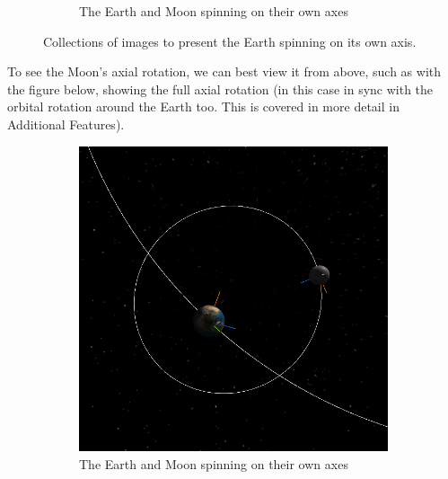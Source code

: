 \documentclass[12pt]{article}
\begin{document}
\begin{figure}[H]
\begin{subfigure}[b]{0.4\textwidth}
                \caption{The Earth and Moon spinning on their own axes}
                \label{fig: The axial spin of the Earth and moon.}
       \end{subfigure}
       \caption{Collections of images to present the Earth spinning on its own axis.}\label{fig: The Earth's individual rotation.}
\end{figure}

To see the Moon's axial rotation, we can best view it from above, such as with the figure below, showing the full axial rotation (in this case in sync with the orbital rotation around the Earth too. This is covered in more detail in Additional Features).

\begin{figure}[H]
        \centering
        \begin{subfigure}[b]{0.4\textwidth}
                \includegraphics[width=\textwidth]{images/earthandmoonaxisspinabove1}
                \caption{The Earth and Moon spinning on their own axes}
                \label{fig: The axial spin of the Earth and moon.}
       \end{subfigure}
        \begin{subfigure}[b]{0.4\textwidth}

\end{subfigure}
\end{figure}
\end{document}
